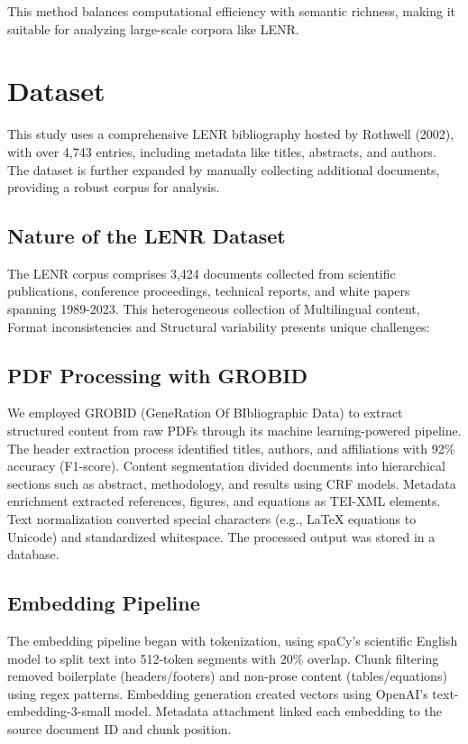 \documentclass[12pt]{article}
\begin{document}
    This method balances computational efficiency with semantic richness, making it suitable for analyzing large-scale corpora like LENR.
\section{Dataset}
    This study uses a comprehensive LENR bibliography hosted by Rothwell (2002), with over 4,743 entries, including metadata like titles, abstracts, and authors. The dataset is further expanded by manually collecting additional documents, providing a robust corpus for analysis.

\subsection{Nature of the LENR Dataset}
The LENR corpus comprises 3,424 documents collected from scientific publications, conference proceedings, technical reports, and white papers spanning 1989-2023. 
This heterogeneous collection of Multilingual content, Format inconsistencies and Structural variability presents unique challenges:

\subsection{PDF Processing with GROBID}
We employed GROBID (GeneRation Of BIbliographic Data) to extract structured content from raw PDFs through its machine learning-powered pipeline. The header extraction process identified titles, authors, and affiliations with 92\% accuracy (F1-score). Content segmentation divided documents into hierarchical sections such as abstract, methodology, and results using CRF models. Metadata enrichment extracted references, figures, and equations as TEI-XML elements. Text normalization converted special characters (e.g., LaTeX equations to Unicode) and standardized whitespace. The processed output was stored in a database.

\subsection{Embedding Pipeline}
The embedding pipeline began with tokenization, using spaCy's scientific English model to split text into 512-token segments with 20\% overlap. Chunk filtering removed boilerplate (headers/footers) and non-prose content (tables/equations) using regex patterns. Embedding generation created vectors using OpenAI's text-embedding-3-small model. Metadata attachment linked each embedding to the source document ID and chunk position.
\end{document}
